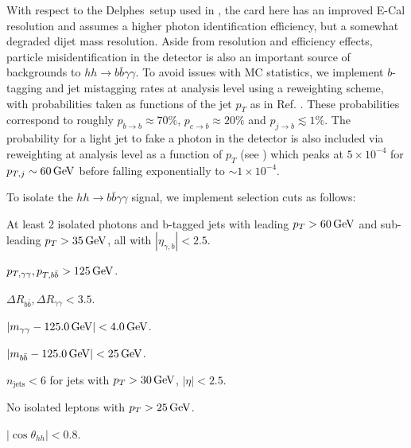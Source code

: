 With respect to the {\sc\small Delphes}\ setup used in \cite{Homiller:2018xxx}, the card here has an improved E-Cal resolution and assumes a higher photon identification efficiency, but a somewhat degraded dijet mass resolution. Aside from resolution and efficiency effects, particle misidentification in the detector is also an important source of backgrounds to $hh\rightarrow b\bar{b}\gamma\gamma$. To avoid issues with MC statistics, we implement $b$-tagging and jet mistagging rates at analysis level using a reweighting scheme, with probabilities taken as functions of the jet $p_T$ as in Ref. \cite{Homiller:2018xxx}. These probabilities correspond to roughly $p_{b\rightarrow b} \approx 70\%$, $p_{c\rightarrow b} \approx 20\%$ and $p_{j\rightarrow b} \lesssim 1\%$. The probability for a light jet to fake a photon in the detector is also included via reweighting at analysis level as a function of $p_T$ (see \cite{Homiller:2018xxx}) which peaks at $5\times 10^{-4}$ for $p_{T,j} \sim 60\, {\rm GeV}$ before falling exponentially to $\sim 1\times 10^{-4}$.



To isolate the $hh \rightarrow b\bar{b}\gamma\gamma$ signal, we implement selection cuts as follows:
\begin{itemize}
\setlength\itemsep{0.25em}
  \item At least 2 isolated photons and b-tagged jets with leading $p_T > 60\, {\rm GeV}$ and sub-leading $p_T > 35\, {\rm GeV}$, all with $|\eta_{\gamma,b}| < 2.5$.
  
\begin{minipage}{0.49\textwidth}
  \item $p_{T,\gamma\gamma}, p_{T,b\bar{b}} > 125\, {\rm GeV}$.
  \item $\Delta R_{b\bar{b}}, \Delta R_{\gamma\gamma} < 3.5.$
  \item $|m_{\gamma\gamma} - 125.0\, {\rm GeV}| < 4.0\, {\rm GeV}$.
  \item $|m_{b\bar{b}} - 125.0\, {\rm GeV}| < 25\, {\rm GeV}$.
\end{minipage}
\begin{minipage}{0.49\textwidth}
  \item $n_{\text{jets}} < 6$ for jets with $p_T > 30\, {\rm GeV}$, $|\eta| < 2.5$.
  \item No isolated leptons with $p_T > 25\, {\rm GeV}$.
  \item $|\cos\theta_{hh}| < 0.8$.
\end{minipage}
\end{itemize}

